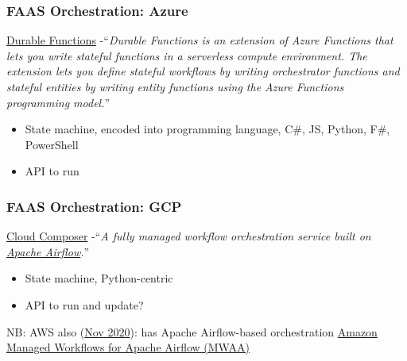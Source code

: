 \documentclass[11pt,aspectratio=169]{beamer}
\begin{document}
\begin{nrcanFrame}
  \frametitle{FAAS Orchestration: Azure}
    \href{https://docs.microsoft.com/en-us/azure/azure-functions/durable/}
         {Durable Functions}
         -``\textit{Durable Functions is an extension of Azure
           Functions that lets you write stateful functions in a
           serverless compute environment. The extension lets you
           define stateful workflows by writing orchestrator functions
           and stateful entities by writing entity functions using the
           Azure Functions programming model.}''
         \begin{itemize}
         \item State machine, encoded into programming language, C\#,
           JS, Python, F\#, PowerShell
         \item API \alert{to run}
         \end{itemize}
\end{nrcanFrame}

\begin{nrcanFrame}
  \frametitle{FAAS Orchestration: GCP}
  \href{https://cloud.google.com/composer/}
       {Cloud Composer}
       -``\textit{A fully managed workflow orchestration service
         built on
         \href{https://airflow.apache.org/}{Apache Airflow}.}''
       \begin{itemize}
       \item State machine, Python-centric
       \item API to run and update?
       \end{itemize}
       \vspace{3mm}
       NB: AWS also
       (\href{https://aws.amazon.com/about-aws/whats-new/2020/11/introducing-amazon-managed-workflows-for-apache-airflow-mwaa/}
       {Nov 2020}):
       has Apache Airflow-based orchestration
       \href{https://aws.amazon.com/managed-workflows-for-apache-airflow/}
            {Amazon Managed Workflows for Apache Airflow (MWAA)}
\end{nrcanFrame}


\nrcanLastFrame
\end{document}
